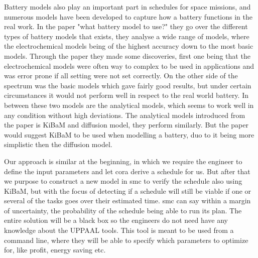 Battery models also play an important part in schedules for space missions, and numerous models have been developed to capture how a battery functions in the real work. In the paper "what battery model to use?" they go over the different types of battery models that exists, they analyse a wide range of models, where the electrochemical models being of the highest accuracy down to the most basic models. 
Through the paper they made some discoveries, first one being that the electrochemical models were often way to complex to be used in applications and was error prone if all setting were not set correctly. On the other side of the spectrum was the basic models which gave fairly good results, but under certain circumstances it would not perform well in respect to the real world battery. In between these two models are the analytical models, which seems to work well in any condition without high deviations. The analytical models introduced from the paper is KiBaM and diffusion model, they perform similarly. But the paper would suggest KiBaM to be used when modelling a battery, duo to it being more simplistic then the diffusion model.

Our approach is similar at the beginning, in which we require the engineer to define the input parameters and let \gls{cora} derive a schedule for us. But after that we purpose to construct a new model in \gls{smc} to verify the schedule also using KiBaM, but with the focus of detecting if a schedule will still be viable if one or several of the tasks goes over their estimated time. \Gls{smc} can say within a margin of uncertainty, the probability of the schedule being able to run its plan. The entire solution will be a black box so the engineers do not need have any knowledge about the UPPAAL tools. This tool is meant to be used from a command line, where they will be able to specify which parameters to optimize for, like profit, energy saving etc.





